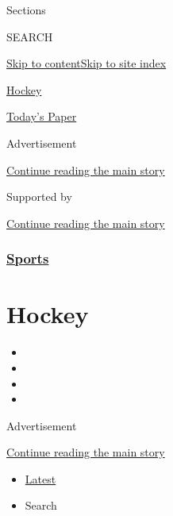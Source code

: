 Sections

SEARCH

\protect\hyperlink{site-content}{Skip to
content}\protect\hyperlink{site-index}{Skip to site index}

\href{https://www.nytimes3xbfgragh.onion/section/sports/hockey}{Hockey}

\href{https://myaccount.nytimes3xbfgragh.onion/auth/login?response_type=cookie\&client_id=vi}{}

\href{https://www.nytimes3xbfgragh.onion/section/todayspaper}{Today's
Paper}

Advertisement

\protect\hyperlink{after-top}{Continue reading the main story}

Supported by

\protect\hyperlink{after-sponsor}{Continue reading the main story}

\hypertarget{sports}{%
\subsubsection{\texorpdfstring{\href{/section/sports}{Sports}}{Sports}}\label{sports}}

\hypertarget{hockey}{%
\section{Hockey}\label{hockey}}

\begin{itemize}
\item
\item
\item
\item
\end{itemize}

Advertisement

\protect\hyperlink{after-subheader}{Continue reading the main story}

\begin{itemize}
\tightlist
\item
  \protect\hyperlink{stream-panel}{Latest}
\item
  Search
\end{itemize}

